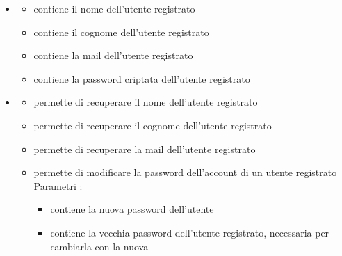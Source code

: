 \begin{itemize}
\item {}
\begin{itemize}
\item {}
\newline
contiene il nome dell'utente registrato
\item {}
\newline
contiene il cognome dell'utente registrato
\item {}
\newline
contiene la mail dell'utente registrato
\item {}
\newline
contiene la password criptata dell'utente registrato
\end{itemize}
\item {}
\begin{itemize}
\item {}
\newline
permette di recuperare il nome dell'utente registrato
\newline
\item {}
\newline
permette di recuperare il cognome dell'utente registrato
\newline
\item {}
\newline
permette di recuperare la mail dell'utente registrato
\newline
\item {}
\newline
permette di modificare la password dell'account di un utente registrato
\newline
Parametri :
\begin{itemize}
\item {}
\newline
contiene la nuova password dell'utente
\item {}
\newline
contiene la vecchia password dell'utente registrato, necessaria per cambiarla con la nuova
\end{itemize}
\end{itemize}
\end{itemize}

